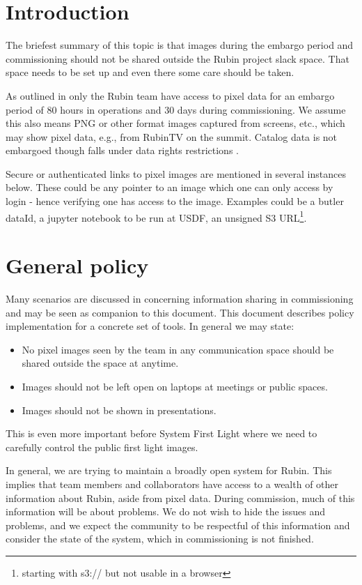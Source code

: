 
\section{Introduction}
The briefest summary of this topic is that images during the embargo period and commissioning should not be shared outside the Rubin project slack space.
That space needs to be set up and even there some care should be taken.

As outlined in  only the Rubin team have access to pixel data for an embargo period of 80 hours in operations and 30 days during commissioning. We assume this also means PNG or other format images captured from screens, etc., which may show pixel data, e.g., from RubinTV on the summit.
Catalog data is not embargoed though falls under data rights restrictions .

Secure or authenticated links to pixel images are mentioned in several instances below.
These could be any pointer to an image which one can only access by login - hence verifying one has access to the image. Examples could be a butler dataId, a jupyter notebook to be run at USDF, an unsigned S3 URL\footnote{starting with s3:// but not usable in a browser}.


\section{General policy} \label{sec:genpol}
Many scenarios are discussed in  concerning information sharing in commissioning and may be seen as companion to this document.
This document describes policy implementation for a concrete set of tools.
In general we may state:

\begin{itemize}
\item No pixel images seen by the team in any communication space should be shared outside the space at anytime.
\item Images should not be left open on laptops at meetings or public spaces.
\item Images should not be shown in presentations.
\end{itemize}

This is even more important before System First Light where we need to carefully control the public first light images.

In general, we are trying to maintain a broadly open system for Rubin.
This implies that team members and collaborators have access to a wealth of other information about Rubin, aside from pixel data.
During commission, much of this information will be about problems.
We do not wish to hide the issues and problems, and we expect the community to be respectful of this information and consider the state of the system, which in commissioning is not finished.

